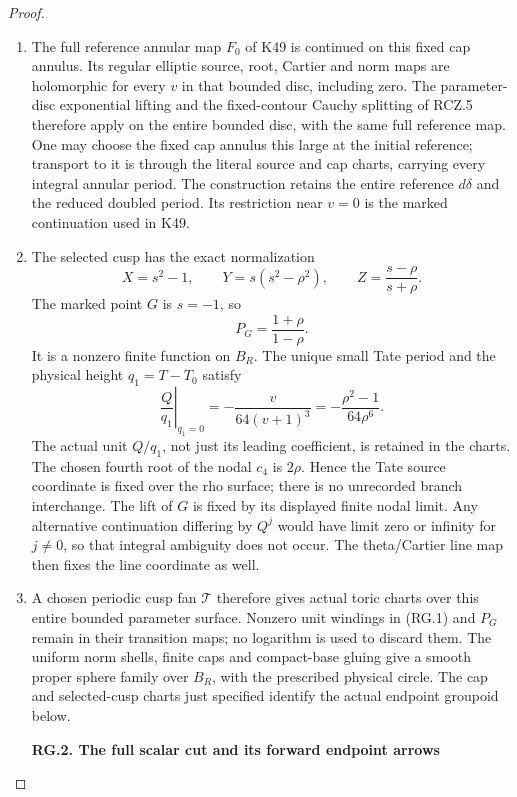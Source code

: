 \begin{proof}
\begin{enumerate}[label=\arabic*.]
\item The full reference annular map \(F_0\) of K49 is continued on
this fixed cap annulus. Its regular elliptic source, root,
Cartier and norm maps are holomorphic for every \(v\) in that
bounded disc, including zero. The parameter-disc exponential
lifting and the fixed-contour Cauchy splitting of RCZ.5 therefore
apply on the entire bounded disc, with the same full reference
map. One may choose the fixed cap annulus this large at the
initial reference; transport to it is through the literal source
and cap charts, carrying every integral annular period. The
construction retains the entire reference \(d\delta\) and the
reduced doubled period. Its restriction near \(v=0\) is the
marked continuation used in K49.

\item The selected cusp has the exact normalization
\[
 X=s^2-1,\qquad Y=s(s^2-\rho^2),\qquad
 Z=\frac{s-\rho}{s+\rho}.
\]
The marked point \(G\) is \(s=-1\), so
\[
 P_G=\frac{1+\rho}{1-\rho}.
\]
It is a nonzero finite function on \(B_R\). The unique small
Tate period and the physical height \(q_1=T-T_0\) satisfy
\[
 \left.\frac{Q}{q_1}\right|_{q_1=0}
       =-\frac{v}{64(v+1)^3}
       =-\frac{\rho^2-1}{64\rho^6}.                 \tag{RG.1}
\]
The actual unit \(Q/q_1\), not just its leading coefficient, is
retained in the charts. The chosen fourth root of the nodal
\(c_4\) is \(2\rho\). Hence the Tate source coordinate is fixed
over the rho surface; there is no unrecorded branch interchange.
The lift of \(G\) is fixed by its displayed finite nodal limit.
Any alternative continuation differing by \(Q^j\) would have
limit zero or infinity for \(j\ne0\), so that integral ambiguity
does not occur. The theta/Cartier line map then fixes the line
coordinate as well.

\item A chosen periodic cusp fan \(\mathcal T\) therefore gives actual
toric charts over this entire bounded parameter surface.
Nonzero unit windings in (RG.1) and \(P_G\) remain in their
transition maps; no logarithm is used to discard them.
The uniform norm shells, finite caps and compact-base gluing
give a smooth proper sphere family over \(B_R\), with the
prescribed physical circle. The cap and selected-cusp charts
just specified identify the actual endpoint groupoid below.

\par

\medskip\noindent\textbf{RG.2. The full scalar cut and its forward endpoint arrows}


\end{enumerate}
\end{proof}
